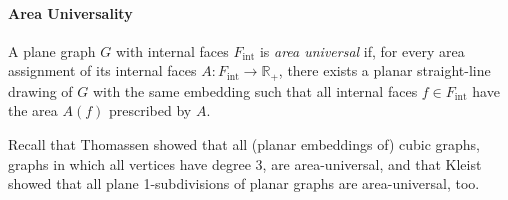 \paragraph{Area Universality}

A plane graph $G$ with internal faces $F_\text{int}$ is \emph{area universal} if, for every area assignment of its internal faces $A \colon F_\text{int} \to \mathbb{R}_+$, there exists a planar straight-line drawing of $G$ with the same embedding such that all internal faces $f \in F_\text{int}$ have the area $A(f)$ prescribed by $A$.

Recall that Thomassen \cite{thomassen1992plane} showed that all (planar embeddings of) cubic graphs, \ie{} graphs in which all vertices have degree 3, are area-universal, and that Kleist \cite{kleist2019planar} showed that all plane 1-subdivisions of planar graphs are area-universal, too.
